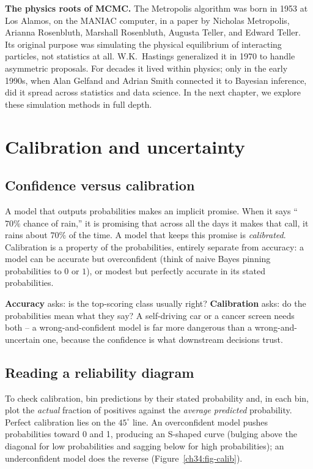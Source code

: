 \begin{connectionbox}
\textbf{The physics roots of MCMC.}
The Metropolis algorithm was born in 1953 at Los Alamos, on the MANIAC computer,
in a paper by Nicholas Metropolis, Arianna Rosenbluth, Marshall Rosenbluth, Augusta Teller,
and Edward Teller. Its original purpose was simulating the physical equilibrium of interacting
particles, not statistics at all. W.K.\ Hastings generalized it in 1970 to handle asymmetric proposals.
For decades it lived within physics; only in the early 1990s, when Alan Gelfand and Adrian Smith
connected it to Bayesian inference, did it spread across statistics and data science. In the
next chapter, we explore these simulation methods in full depth.
\end{connectionbox}

\section{Calibration and uncertainty}
\label{ch34:calibration}

\subsection{Confidence versus calibration}

A model that outputs probabilities makes an implicit promise. When it says ``$70\%$
chance of rain,'' it is promising that across all the days it makes that call, it
rains about $70\%$ of the time. A model that keeps this promise is
\emph{calibrated}. Calibration is a property of the probabilities, entirely
separate from accuracy: a model can be accurate but overconfident (think of
naive Bayes pinning probabilities to $0$ or $1$), or modest but perfectly accurate
in its stated probabilities.

\begin{focusbox}
\textbf{Accuracy} asks: is the top-scoring class usually right? \textbf{Calibration}
asks: do the probabilities mean what they say? A self-driving car or a cancer
screen needs both -- a wrong-and-confident model is far more dangerous than a
wrong-and-uncertain one, because the confidence is what downstream decisions
trust.
\end{focusbox}

\subsection{Reading a reliability diagram}

To check calibration, bin predictions by their stated probability and, in each
bin, plot the \emph{actual} fraction of positives against the \emph{average
predicted} probability. Perfect calibration lies on the $45^\circ$ line. An overconfident model pushes probabilities toward 0 and 1, producing an S-shaped curve (bulging above the diagonal for low probabilities and sagging below for high probabilities); an underconfident model does the reverse (Figure~\ref{ch34:fig-calib}).

